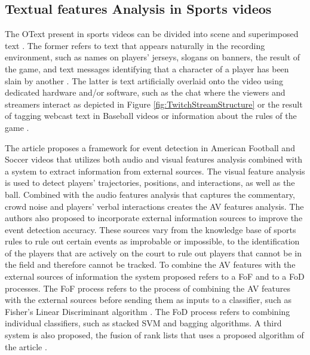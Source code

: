 \subsection{Textual features Analysis in Sports videos}

    The \gls{OText} present in sports videos can be divided into scene and superimposed text \cite{SOCCER_VIDEO_EVENT_DETECTION}. The former refers to text that appears naturally in the recording environment, such as names on players' jerseys, slogans on banners, the result of the game, and text messages identifying that a character of a player has been slain by another \cite{SOCCER_VIDEO_EVENT_DETECTION} \cite{BroadcatedGames_analysis_LOL}. The latter is text artificially overlaid onto the video using dedicated hardware and/or software, such as the chat where the viewers and streamers interact as depicted in Figure \ref{fig:TwitchStreamStructure} or the result of tagging webcast text in Baseball videos \cite{WebcastText_Baseball_Videos} or information about the rules of the game \cite{FusionAVFeatures_ExternalInformationSources}.

    The article \cite{FusionAVFeatures_ExternalInformationSources} proposes a framework for event detection in American Football and Soccer videos that utilizes both audio and visual features analysis combined with a system to extract information from external sources. The visual feature analysis is used to detect players' trajectories, positions, and interactions, as well as the ball. Combined with the audio features analysis that captures the commentary, crowd noise and players' verbal interactions creates the \gls{AV} features analysis. The authors also proposed to incorporate external information sources to improve the event detection accuracy. These sources vary from the knowledge base of sports rules to rule out certain events as improbable or impossible, to the identification of the players that are actively on the court to rule out players that cannot be in the field and therefore cannot be tracked. To combine the \gls{AV} features with the external sources of information the system proposed refers to a \gls{FoF} and to a \gls{FoD} processes. The \gls{FoF} process refers to the process of combining the \gls{AV} features with the external sources before sending them as inputs to a classifier, such as Fisher's Linear Discriminant algorithm \cite{LinearDiscriminantAnalysis}. The \gls{FoD} process refers to combining individual classifiers, such as stacked \gls{SVM} and bagging algorithms. A third system is also proposed, the fusion of rank lists that uses a proposed algorithm of the article \cite{OptimalMultimodalFusion}.

